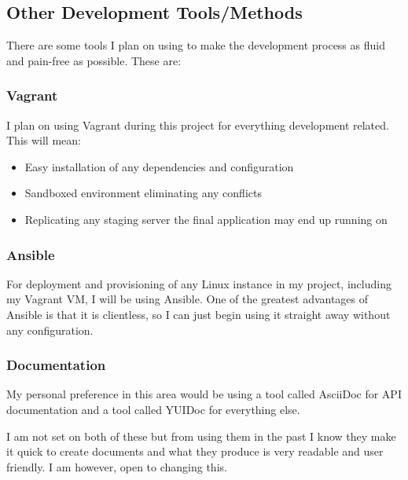 \documentclass{article}
\begin{document}
\newpage
\subsection{Other Development Tools/Methods}
There are some tools I plan on using to make the development process as fluid and pain-free as possible. These are:

	\subsubsection{Vagrant}
		I plan on using Vagrant during this project for everything development related. This will mean:
		\begin{itemize}
			\item Easy installation of any dependencies and configuration
			\item Sandboxed environment eliminating any conflicts
			\item Replicating any staging server the final application may end up running on
		\end{itemize}
	\subsubsection{Ansible}
		For deployment and provisioning of any Linux instance in my project, including my Vagrant VM, I will be using Ansible. One of the greatest advantages of Ansible is that it is clientless, so I can just begin using it straight away without any configuration.
	\subsubsection{Documentation}
		My personal preference in this area would be using a tool called AsciiDoc for API documentation and a tool called YUIDoc for everything else. 
		
		I am not set on both of these but from using them in the past I know they make it quick to create documents and what they produce is very readable and user friendly. I am however, open to changing this.

\newpage
\end{document}
